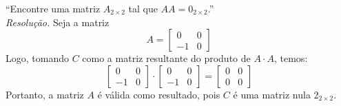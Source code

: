 \enquote{Encontre uma matriz $A_{2\times2}$ tal que $AA = 0_{2\times2}$.}
\\ 
\emph{Resolução.} Seja a matriz
\begin{displaymath}
    A = \left[ \begin{array}{cc}
         0 & 0  \\
         -1& 0 
    \end{array}\right]
\end{displaymath}
Logo, tomando $C$ como a matriz resultante do produto de $A \cdot A$, temos:
\begin{displaymath}
    \left[ \begin{array}{cc}
        0 & 0  \\
        -1& 0 
    \end{array}\right] \cdot
    \left[ \begin{array}{cc}
        0 & 0  \\
        -1& 0 
    \end{array}\right]
    =
    \left[ \begin{array}{cc}
        0 & 0  \\
        0 & 0 
    \end{array}\right]
\end{displaymath}
Portanto, a matriz $A$ é válida como resultado, pois $C$ é uma matriz nula $2_{2\times2}$.